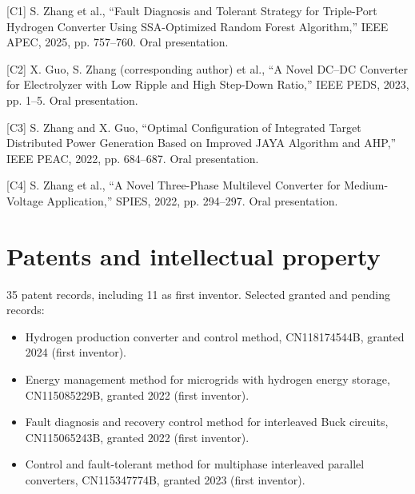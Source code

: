 \documentclass[10pt,a4paper]{article}
\begin{document}
[C1] S. Zhang et al., “Fault Diagnosis and Tolerant Strategy for Triple-Port Hydrogen Converter Using SSA-Optimized Random Forest Algorithm,” IEEE APEC, 2025, pp. 757–760. Oral presentation.\par

[C2] X. Guo, S. Zhang (corresponding author) et al., “A Novel DC–DC Converter for Electrolyzer with Low Ripple and High Step-Down Ratio,” IEEE PEDS, 2023, pp. 1–5. Oral presentation.\par

[C3] S. Zhang and X. Guo, “Optimal Configuration of Integrated Target Distributed Power Generation Based on Improved JAYA Algorithm and AHP,” IEEE PEAC, 2022, pp. 684–687. Oral presentation.\par

[C4] S. Zhang et al., “A Novel Three-Phase Multilevel Converter for Medium-Voltage Application,” SPIES, 2022, pp. 294–297. Oral presentation.\par

\section*{Patents and intellectual property}

35 patent records, including 11 as first inventor. Selected granted and pending records:\par

\begin{itemize}\item Hydrogen production converter and control method, CN118174544B, granted 2024 (first inventor).\end{itemize}

\begin{itemize}\item Energy management method for microgrids with hydrogen energy storage, CN115085229B, granted 2022 (first inventor).\end{itemize}

\begin{itemize}\item Fault diagnosis and recovery control method for interleaved Buck circuits, CN115065243B, granted 2022 (first inventor).\end{itemize}

\begin{itemize}\item Control and fault-tolerant method for multiphase interleaved parallel converters, CN115347774B, granted 2023 (first inventor).\end{itemize}
\end{document}

